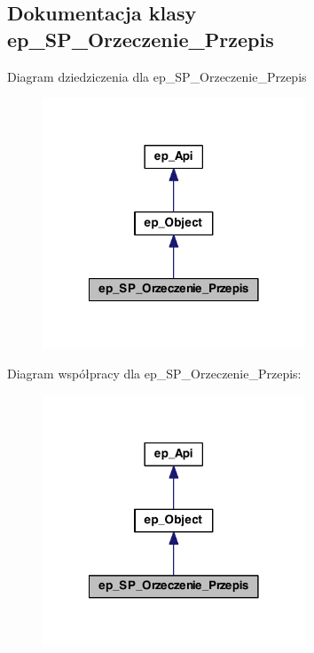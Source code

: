 \hypertarget{classep___s_p___orzeczenie___przepis}{\subsection{Dokumentacja klasy ep\-\_\-\-S\-P\-\_\-\-Orzeczenie\-\_\-\-Przepis}
\label{classep___s_p___orzeczenie___przepis}
}


Diagram dziedziczenia dla ep\-\_\-\-S\-P\-\_\-\-Orzeczenie\-\_\-\-Przepis\nopagebreak
\begin{figure}[H]
\begin{center}
\leavevmode
\includegraphics[width=222pt]{classep___s_p___orzeczenie___przepis__inherit__graph}
\end{center}
\end{figure}


Diagram współpracy dla ep\-\_\-\-S\-P\-\_\-\-Orzeczenie\-\_\-\-Przepis\-:\nopagebreak
\begin{figure}[H]
\begin{center}
\leavevmode
\includegraphics[width=222pt]{classep___s_p___orzeczenie___przepis__coll__graph}
\end{center}
\end{figure}
